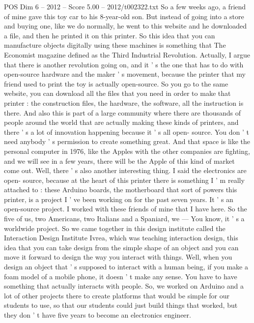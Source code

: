 \begin{textsample}{POS Dim 6 – 2012 – Score 5.00 – 2012/t002322.txt}  \label{ex:f6_pos_041}
So a few weeks ago, a friend of mine gave this toy car to his 8-year-old son.
But instead of going into a store and buying one, like we do normally, he went to this website and he downloaded a file, and then he printed it on this printer.
So this idea that you can manufacture objects digitally using these machines is something that The Economist magazine defined as the Third Industrial Revolution.
Actually, I argue that there is another revolution going on, and it ' s the one that has to do with open-source hardware and the maker ' s movement, because the printer that my friend used to print the toy is actually open-source.
So you go to the same website, you can download all the files that you need in order to make that printer : the construction files, the hardware, the software, all the instruction is there.
And also this is part of a large community where there are thousands of people around the world that are actually making these kinds of printers, and there ' s a lot of innovation happening because it ' s all open- source.
You don ' t need anybody ' s permission to create something great.
And that space is like the personal computer in 1976, like the Apples with the other companies are fighting, and we will see in a few years, there will be the Apple of this kind of market come out.
Well, there ' s also another interesting thing.
I said the electronics are open- source, because at the heart of this printer there is something I ' m really attached to : these Arduino boards, the motherboard that sort of powers this printer, is a project I ' ve been working on for the past seven years.
It ' s an open-source project.
I worked with these friends of mine that I have here.
So the five of us, two Americans, two Italians and a Spaniard, we — You know, it ' s a worldwide project.
So we came together in this design institute called the Interaction Design Institute Ivrea, which was teaching interaction design, this idea that you can take design from the simple shape of an object and you can move it forward to design the way you interact with things.
Well, when you design an object that ' s supposed to interact with a human being, if you make a foam model of a mobile phone, it doesn ' t make any sense.
You have to have something that actually interacts with people.
So, we worked on Arduino and a lot of other projects there to create platforms that would be simple for our students to use, so that our students could just build things that worked, but they don ' t have five years to become an electronics engineer.

\end{textsample}
